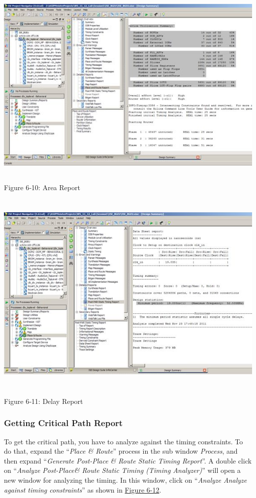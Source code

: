 \documentclass[
]{article}
\begin{document}
\includegraphics[width=5.77559in,height=3.74948in]{6-10.png}

Figure 6‑10:\protect\hypertarget{Fig610}{}{} Area Report

\includegraphics[width=6.09196in,height=3.97917in]{6-11.png}

Figure 6‑11:\protect\hypertarget{Fig611}{}{} Delay Report

\hypertarget{getting-critical-path-report}{%
\subsubsection{Getting Critical Path
Report}\label{getting-critical-path-report}}

To get the critical path, you have to analyze against the timing
constraints. To do that, expand the ``\emph{Place \& Route}'' process in
the sub window \emph{Process}, and then expand ``\emph{Generate
Post-Place \& Route Static Timing Report}''. A double click on
``\emph{Analyze Post-Place\& Route Static Timing (Timing Analyzer)}''
will open a new window for analyzing the timing. In this window, click
on ``\emph{Analyze Analyze against timing constraints}'' as shown in
\protect\hyperlink{Fig612}{Figure 6-12}.
\end{document}
